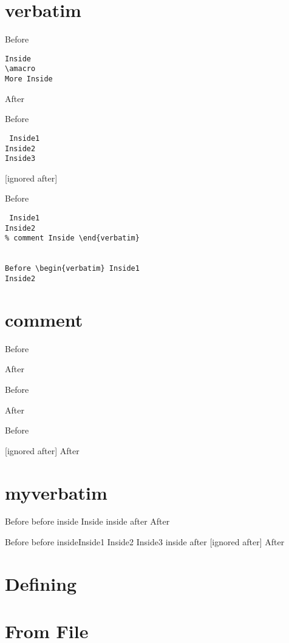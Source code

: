 \documentclass{article}
\newenvironment{myverbatim}{%
before \verbatim inside}{%
inside \endverbatim after}
\begin{document}
\section{verbatim}
Before
\begin{verbatim}
Inside
\amacro
More Inside
\end{verbatim}
After

Before \begin{verbatim} Inside1
Inside2
Inside3 \end{verbatim} [ignored after]

Before \begin{verbatim} Inside1
Inside2
% comment Inside \end{verbatim}


Before \begin{verbatim} Inside1
Inside2
\end {verbatim}

\section{comment}
Before
\begin{comment}
Inside
\end{comment}
After

Before
\begin{comment}
Inside
\end {comment}
After

Before \begin{comment}Inside1
Inside2
Inside3 \end{comment} [ignored after]
After

\section{myverbatim}
Before
\begin{myverbatim}
Inside
\end{myverbatim}
After

Before \begin{myverbatim}Inside1
Inside2
Inside3 \end{myverbatim} [ignored after]
After

\section{Defining}


\section{From File}

\end{document}
